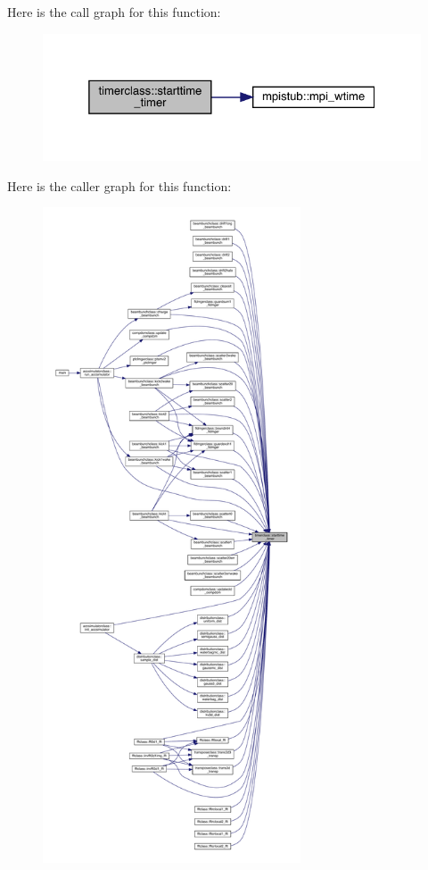 Here is the call graph for this function\+:\nopagebreak
\begin{figure}[H]
\begin{center}
\leavevmode
\includegraphics[width=325pt]{namespacetimerclass_afb272bcdcff72d225c2df5862630025c_cgraph}
\end{center}
\end{figure}
Here is the caller graph for this function\+:\nopagebreak
\begin{figure}[H]
\begin{center}
\leavevmode
\includegraphics[height=550pt]{namespacetimerclass_afb272bcdcff72d225c2df5862630025c_icgraph}
\end{center}
\end{figure}



